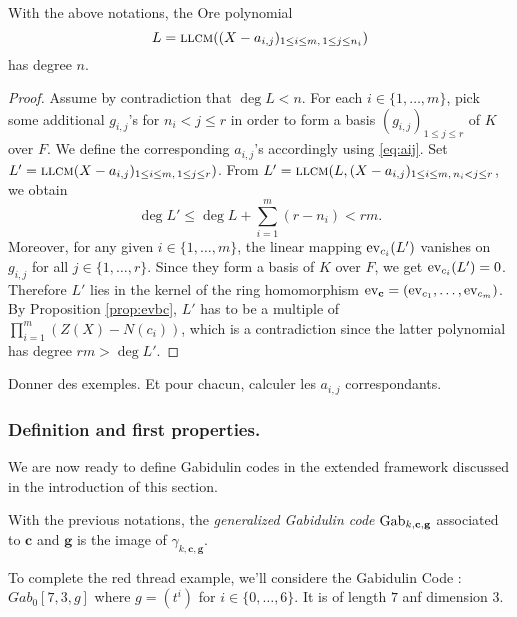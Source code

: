 \documentclass[a4paper]{llncs}
\def\todo#1{{\color{todo} #1}}
\newcommand{\ev}[1]{\textrm{\rm ev}_{#1}}
\newcommand{\llcm}{\textsc{llcm}}
\newcommand{\bc}{\textbf{c}}
\newcommand{\bg}{\textbf{g}}
\newcommand{\Gab}{\textrm{\rm Gab}}
\begin{document}
\begin{lemma}
\label{lem:llcmaij}
With the above notations, the Ore polynomial
$$L = \llcm((X - a_{i,j})_{1 \leq i \leq m,\,1 \leq j \leq n_i})$$
has degree $n$.
\end{lemma}

\begin{proof}
Assume by contradiction that $\deg L < n$.
For each $i \in \{1,\ldots,m\}$, pick some additional $g_{i,j}$'s
for $n_i < j \leq r$ in order to form a basis $(g_{i,j})_{1 \leq j 
\leq r}$ of $K$ over $F$. We define the corresponding $a_{i,j}$'s
accordingly using \eqref{eq:aij}. 
Set $L' = \llcm(X - a_{i,j})_{1 \leq i \leq m,\,1 \leq j \leq r})$.
From
$L' = \llcm(L, (X - a_{i,j})_{1 \leq i \leq m,\,n_i < j \leq r}$,
we obtain 
$$\deg L' \leq \deg L + \sum_{i=1}^m (r - n_i) < rm.$$
Moreover, for any given $i \in \{1,\ldots, m\}$, the linear mapping 
$\ev{c_i}(L')$ vanishes on $g_{i,j}$ for all $j \in \{1, \ldots,r\}$. 
Since they form a basis of $K$ over $F$, we get $\ev{c_i}(L') = 0$.
Therefore $L'$ lies in the kernel of the ring homomorphism $\ev\bc =
(\ev{c_1}, \ldots, \ev{c_m})$. By Proposition \ref{prop:evbc},
$L'$ has to be a multiple of $\prod_{i=1}^m (Z(X) - N(c_i))$,
which is a contradiction since the latter polynomial has degree $rm > 
\deg L'$.
\end{proof}

\todo{Donner des exemples. Et pour chacun, calculer les $a_{i,j}$
correspondants.}

\subsubsection*{Definition and first properties.}

We are now ready to define Gabidulin codes in the extended framework
discussed in the introduction of this section.

\begin{definition}%
With the previous notations, the \emph{generalized Gabidulin code} 
$\Gab_{k,\bc,\bg}$ associated to $\bc$ and $\bg$ is the image of 
$\gamma_{k,\bc,\bg}$.
\end{definition}

\begin{example}
To complete the red thread example, we'll considere the Gabidulin Code : $Gab_0[7,3,g]$ where $g = (t^i)$ for $i \in \{0, \dots, 6\}$. It is of length  $7$ anf dimension $3$.
\end{example}
\end{document}
